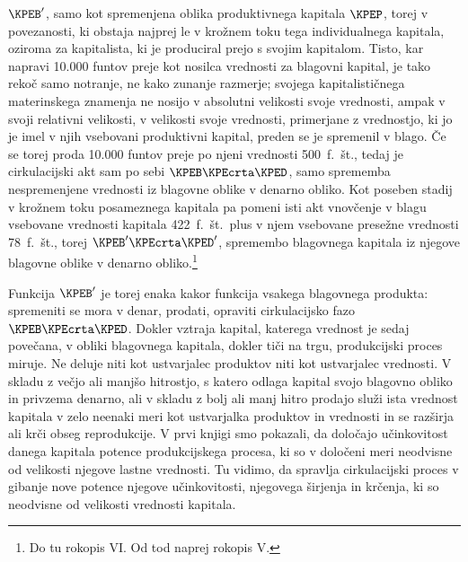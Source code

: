 \documentclass[kapital_02.tex]{subfiles}
\begin{document}
\(\KPEB'\), samo kot spremenjena oblika produktivnega kapitala \(\KPEP\), torej v povezanosti, ki obstaja najprej le v krožnem toku tega individualnega kapitala, oziroma za kapitalista, ki je produciral prejo s svojim kapitalom. Tisto, kar napravi 10.000 funtov preje kot nosilca vrednosti za blagovni kapital, je tako rekoč samo notranje, ne kako zunanje razmerje; svojega kapitalističnega materinskega znamenja ne nosijo v absolutni \KPEstran velikosti svoje vrednosti, ampak v svoji relativni velikosti, v velikosti svoje vrednosti, primerjane z vrednostjo, ki jo je imel v njih vsebovani produktivni kapital, preden se je spremenil v blago. Če se torej proda 10.000 funtov preje po njeni vrednosti 500\ f.\ št., tedaj je cirkulacijski akt sam po sebi \(\KPEB\KPEcrta\KPED\), samo sprememba nespremenjene vrednosti iz blagovne oblike v denarno obliko. Kot poseben stadij v krožnem toku posameznega kapitala pa pomeni isti akt vnovčenje v blagu vsebovane vrednosti kapitala 422\ f.\ št.\ plus v njem vsebovane presežne vrednosti 78\ f.\ št., torej \(\KPEB'\KPEcrta\KPED'\), spremembo blagovnega kapitala iz njegove blagovne oblike v denarno obliko.\footnote{Do tu rokopis VI. Od tod naprej rokopis V.}

Funkcija \(\KPEB'\) je torej enaka kakor funkcija vsakega blagovnega produkta: spremeniti se mora v denar, prodati, opraviti cirkulacijsko fazo \(\KPEB\KPEcrta\KPED\). Dokler vztraja kapital, katerega vrednost je sedaj povečana, v obliki blagovnega kapitala, dokler tiči na trgu, produkcijski proces miruje. Ne deluje niti kot ustvarjalec produktov niti kot ustvarjalec vrednosti. V skladu z večjo ali manjšo hitrostjo, s katero odlaga kapital svojo blagovno obliko in privzema denarno, ali v skladu z bolj ali manj hitro prodajo služi ista vrednost kapitala v zelo neenaki meri kot ustvarjalka produktov in vrednosti in se razširja ali krči obseg reprodukcije. V prvi knjigi smo pokazali, da določajo učinkovitost danega kapitala potence produkcijskega procesa, ki so v določeni meri neodvisne od velikosti njegove lastne vrednosti. Tu vidimo, da spravlja cirkulacijski proces v gibanje nove potence njegove učinkovitosti, njegovega širjenja in krčenja, ki so neodvisne od velikosti vrednosti kapitala.
\end{document}
